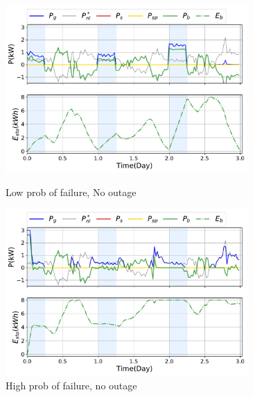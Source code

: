 \documentclass{ifacconf}
\begin{document}
 \begin{figure}[!ht]
  
    \begin{minipage}{.49\linewidth}
       
        \includegraphics[height=2.5in,width=1\columnwidth]{Figures/Mc_LowFailNoOut.pdf}
        \caption{Low prob of failure, No outage}
        \label{fig:LOwFailNoOut}    
    \end{minipage}%
    \begin{minipage}{.01\linewidth}
      \hspace{1px}
    \end{minipage}%
    \begin{minipage}{0.49\linewidth}
        \includegraphics[height=2.5in,width=1\columnwidth]{Figures/Mc_HighFailNoOut.pdf}
        \caption{High prob of failure, no outage}
        \label{fig:HighFailNoOut}
    \end{minipage}
\end{figure}
\end{document}
